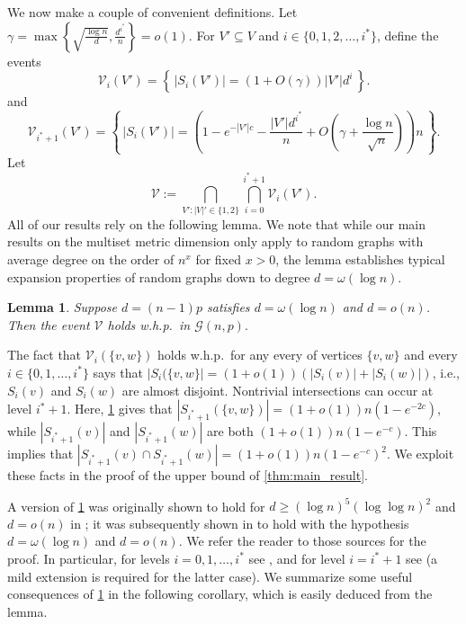 \documentclass[12pt]{article}
\newtheorem{lemma}[theorem]{Lemma}
\theoremstyle{definition}
\theoremstyle{remark}
\theoremstyle{remark}
\numberwithin{theorem}{section}
\newcommand{\Gnp}{\mathcal{G}(n,p)}
\begin{document}
We now make a couple of convenient definitions. Let $\gamma = \max\left\{\sqrt{\frac{\log n}{d}}, \frac{d^{i^{*}}}{n}\right\} =o(1)$. For $V' \subseteq V$ and $i  \in \{ 0,1,2,\dots,i^{*} \} $, define the events
$$
	\mathcal{V}_{i}(V') = \left\{ \, |S_{i}(V')| = (1+O(\gamma))|V'|d^{i} \, \right\}.
$$
and 
$$
	\mathcal{V}_{i^{*}+1}(V') = \left\{\,|S_{i}(V')| = \left(1 - e^{-|V'|c} - \frac{|V'|d^{i^{*}}}{n} + O\left(\gamma + \frac{\log n}{\sqrt{n}} \right) \right)n  \,\right\}.
$$
Let
$$
	\mathcal{V} := \bigcap_{V':|V|' \in \{1,2\}}\bigcap_{i=0}^{i^{*}+1} \mathcal{V}_{i}(V').
$$
All of our results rely on the following lemma. We note that while our main results on the multiset metric dimension only apply to random graphs with average degree on the order of $n^{x}$ for fixed $x >0$, the lemma establishes typical expansion properties of random graphs down to degree $d = \omega(\log n)$.
\begin{lemma}\label{lem:typical_expansion}
	Suppose $d = (n-1)p$ satisfies $d = \omega(\log n)$ and $d = o(n)$. Then the event $\mathcal{V}$ holds w.h.p.\ in $\Gnp.$ 
\end{lemma}

The fact that $\mathcal{V}_{i}(\{v,w\})$ holds w.h.p.\ for any every of vertices $\{v,w\}$ and every $i \in \{ 0,1,\dots,i^{*} \}$ says that $|S_{i}(\{v,w\}| = (1+o(1))(|S_{i}(v)| + |S_{i}(w)|)$, i.e., $S_{i}(v)$ and $S_{i}(w)$ are almost disjoint. Nontrivial intersections can occur at level $i^{*}+1$. Here, \cref{lem:typical_expansion} gives that $|S_{i^{*}+1}(\{v,w\})| = (1+o(1))n(1-e^{-2c})$, while $|S_{i^{*}+1}(v)|$ and $|S_{i^{*}+1}(w)|$ are both $(1+o(1))n(1-e^{-c})$. This implies that $|S_{i^{*}+1}(v) \cap S_{i^{*}+1}(w)| = (1+o(1))n(1-e^{-c})^{2}$. We exploit these facts in the proof of the upper bound of \cref{thm:main_result}.

A version of \cref{lem:typical_expansion} was originally shown to hold for $d \geq (\log n)^{5}(\log\log n)^{2}$ and $d= o(n)$ in \cite{bollobas2013metric}; it was subsequently shown in \cite{odor2021sequential} to hold with the hypothesis $d = \omega(\log n)$ and $d = o(n)$. We refer the reader to those sources for the proof. In particular, for levels $i=0,1,\dots,i^{*}$ see \cite[Lemma 5.1]{odor2021sequential}, and for level $i = i^{*}+1$ see \cite[Lemma 5.3]{odor2021sequential} (a mild extension is required for the latter case). We summarize some useful consequences of \cref{lem:typical_expansion} in the following corollary, which is easily deduced from the lemma. 
\end{document}
